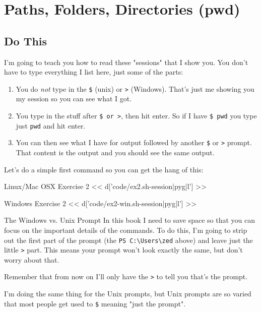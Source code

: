 \chapter{Paths, Folders, Directories (pwd)}

\section{Do This}

I'm going to teach you how to read these "sessions" that I show you.  You don't have to
type everything I list here, just some of the parts:

\begin{enumerate} 
\item You do \emph{not} type in the \verb|$| (unix) or
    \verb|>| (Windows).  That's just me showing you my session so you can see what
    I got.
\item You type in the stuff after \verb|$ or >|, then hit enter.  So if I have \verb|$ pwd| you type just \verb|pwd| and hit enter.
\item You can then see what I have for output followed by another \verb|$| or \verb|>| prompt.  That content is the output and you should see the same output.
\end{enumerate}

Let's do a simple first command so you can get the hang of this:

\begin{code}{Linux/Mac OSX Exercise 2}
<< d['code/ex2.sh-session|pyg|l'] >>
\end{code}

\begin{code}{Windows Exercise 2}
<< d['code/ex2-win.sh-session|pyg|l'] >>
\end{code}

\begin{aside}{The Windows vs. Unix Prompt}
In this book I need to save space so that you can focus on the important
details of the commands.  To do this, I'm going to strip out the 
first part of the prompt (the \verb|PS C:\Users\zed| above) and leave
just the little \verb|>| part.  This means your prompt won't look
exactly the same, but don't worry about that.

Remember that from now on I'll only have the \verb|>| to tell you
that's the prompt.

I'm doing the same thing for the Unix prompts, but Unix prompts are so
varied that most people get used to \verb|$| meaning "just the prompt".
\end{aside}

